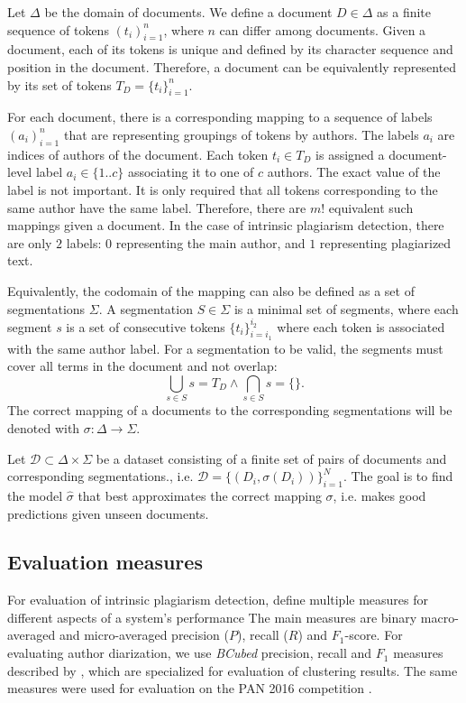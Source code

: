 \documentclass[10pt, a4paper]{article}
\begin{document}
Let $\Delta$ be the domain of documents. We define a document $D\in \Delta$ as a finite sequence of tokens $(t_i)_{i=1}^n$, where $n$ can differ among documents. Given a document, each of its tokens is unique and defined by its character sequence and position in the document. Therefore, a document can be equivalently represented by its set of tokens $T_D=\{t_i\}_{i=1}^n$.

For each document, there is a corresponding mapping to a sequence of labels $(a_i)_{i=1}^n$ that are representing groupings of tokens by authors. The labels $a_i$ are indices of authors of the document. Each token $t_i\in T_D$ is assigned a document-level label $a_i \in \{1..c\}$ associating it to one of $c$ authors. The exact value of the label is not important. It is only required that all tokens corresponding to the same author have the same label. Therefore, there are $m!$ equivalent such mappings given a document. In the case of intrinsic plagiarism detection, there are only $2$ labels: $0$ representing the main author, and $1$ representing plagiarized text.

Equivalently, the codomain of the mapping can also be defined as a set of segmentations $\Sigma$. A segmentation $S\in \Sigma$ is a minimal set of segments, where each segment $s$ is a set of consecutive tokens $\{t_i\}_{i=i_1}^{i_2}$ where each token is associated with the same author label. For a segmentation to be valid, the segments must cover all terms in the document and not overlap:
\begin{equation}
	\bigcup_{s\in S}s = T_D  \wedge \bigcap_{s\in S}s = \{\}.
\end{equation}
The correct mapping of a documents to the corresponding segmentations will be denoted with $\sigma: \Delta\rightarrow\Sigma$.

Let $\mathcal{D} \subset \Delta\times\Sigma$ be a dataset consisting of a finite set of pairs of documents and corresponding segmentations., i.e. $\mathcal{D} = \{\left(D_i, \sigma(D_i)\right)\}_{i=1}^N$. The goal is to find the model $\hat{\sigma}$ that best approximates the correct mapping $\sigma$, i.e. makes good predictions given unseen documents.

\subsection{Evaluation measures} \label{subsec:evaluation-measures}

For evaluation of intrinsic plagiarism detection, \citet{stein-2010} define multiple measures for different aspects of a system's performance The main measures are binary macro-averaged and micro-averaged precision ($P$), recall ($R$) and $F_1$-score. For evaluating author diarization, we use \emph{BCubed} precision, recall and $F_1$ measures described by \citet{amigo-2009}, which are specialized for evaluation of clustering results. The same measures were used for evaluation on the PAN 2016 competition \citep{rosso-2016}.
\end{document}
